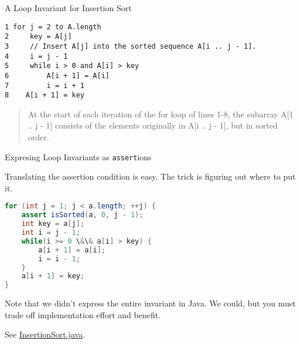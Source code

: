 \documentclass{beamer}
\newcommand{\code}{http://www.cc.gatech.edu/~simpkins/teaching/gatech/cs1331/code}
\begin{document}
\begin{frame}[fragile]{A Loop Invariant for Insertion Sort}

\begin{lstlisting}[]
1 for j = 2 to A.length
2     key = A[j]
3     // Insert A[j] into the sorted sequence A[i .. j - 1].
4     i = j - 1
5     while i > 0 and A[i] > key
6         A[i + 1] = A[i]
7         i = i + 1
8    A[i + 1] = key
\end{lstlisting}

\begin{quote}
At the start of each iteration of the for loop of lines 1-8, the subarray A[1 .. j - 1] consists of the elements originally in A[i .. j - 1], but in sorted order.
\end{quote}

\end{frame}


\begin{frame}[fragile]{Expresing Loop Invariants as {\tt assert}ions}


Translating the assertion condition is easy.  The trick is figuring out where to put it.

\begin{lstlisting}[language=Java]
for (int j = 1; j < a.length; ++j) {
    assert isSorted(a, 0, j - 1);
    int key = a[j];
    int i = j - 1;
    while(i >= 0 \&\& a[i] > key) {
        a[i + 1] = a[i];
        i = i - 1;
    }
    a[i + 1] = key;
}
\end{lstlisting}
Note that we didn't express the entire invariant in Java.  We could, but you must trade off implementation effort and benefit.

\vspace{.1in}
See \href{\code/InsertionSort.java}{InsertionSort.java}.


\end{frame}









\end{document}
